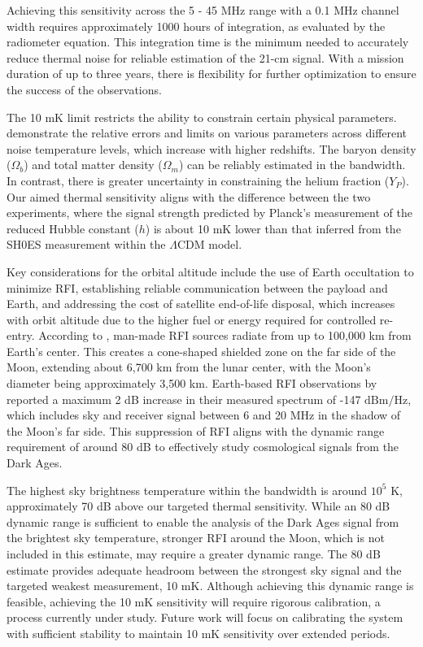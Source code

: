 \documentclass[fleqn,usenatbib]{rasti}
\begin{document}
Achieving this sensitivity across the 5 - 45 MHz range with a 0.1 MHz channel width requires approximately 1000 hours of integration, as evaluated by the radiometer equation. This integration time is the minimum needed to accurately reduce thermal noise for reliable estimation of the 21-cm signal. With a mission duration of up to three years, there is flexibility for further optimization to ensure the success of the observations.

The 10 mK limit restricts the ability to constrain certain physical parameters. \cite{Mondal2024} demonstrate the relative errors and limits on various parameters across different noise temperature levels, which increase with higher redshifts. The baryon density ($\Omega_b$) and total matter density ($\Omega_m$) can be reliably estimated in the bandwidth. In contrast, there is greater uncertainty in constraining the helium fraction ($Y_P$). Our aimed thermal sensitivity aligns with the difference between the two experiments, where the signal strength predicted by Planck’s measurement of the reduced Hubble constant ($h$) \citep{Planck2018} is about 10 mK lower than that inferred from the SH0ES measurement \citep{Riess_2022} within the $\Lambda\text{CDM}$ model.

Key considerations for the orbital altitude include the use of Earth occultation to minimize RFI, establishing reliable communication between the payload and Earth, and addressing the cost of satellite end-of-life disposal, which increases with orbit altitude due to the higher fuel or energy required for controlled re-entry. According to \cite{itu_radio_astronomy_2013}, man-made RFI sources radiate from up to 100,000 km from Earth's center. This creates a cone-shaped shielded zone on the far side of the Moon, extending about 6,700 km from the lunar center, with the Moon’s diameter being approximately 3,500 km. Earth-based RFI observations by \cite{Yan2023} reported a maximum 2 dB increase in their measured spectrum of -147 $\text{dBm}/\text{Hz}$, which includes sky and receiver signal between 6 and 20 MHz in the shadow of the Moon's far side. This suppression of RFI aligns with the dynamic range requirement of around 80 dB to effectively study cosmological signals from the Dark Ages.

The highest sky brightness temperature within the bandwidth is around $10^{5}$ K, approximately 70 dB above our targeted thermal sensitivity. While an 80 dB dynamic range is sufficient to enable the analysis of the Dark Ages signal from the brightest sky temperature, stronger RFI around the Moon, which is not included in this estimate, may require a greater dynamic range. The 80 dB estimate provides adequate headroom between the strongest sky signal and the targeted weakest measurement, 10 mK. Although achieving this dynamic range is feasible, achieving the 10 mK sensitivity will require rigorous calibration, a process currently under study. Future work will focus on calibrating the system with sufficient stability to maintain 10 mK sensitivity over extended periods.
\end{document}
